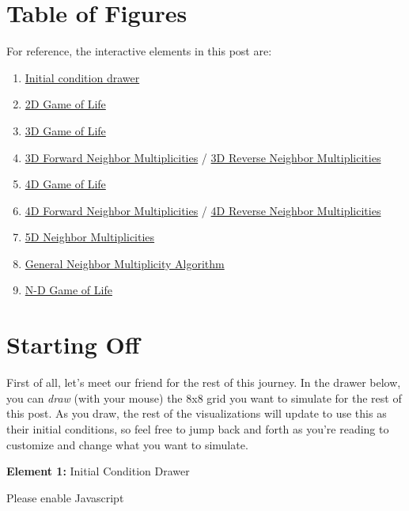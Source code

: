 \documentclass[]{article}
\begin{document}
\hypertarget{table-of-figures}{%
\section{Table of Figures}\label{table-of-figures}}

For reference, the interactive elements in this post are:

\begin{enumerate}
\def\labelenumi{\arabic{enumi}.}
\tightlist
\item
  \protect\hyperlink{golDrawer}{Initial condition drawer}
\item
  \protect\hyperlink{gol2D}{2D Game of Life}
\item
  \protect\hyperlink{gol3D}{3D Game of Life}
\item
  \protect\hyperlink{golSyms3DForward}{3D Forward Neighbor Multiplicities} /
  \protect\hyperlink{golSyms3DReverse}{3D Reverse Neighbor Multiplicities}
\item
  \protect\hyperlink{gol4D}{4D Game of Life}
\item
  \protect\hyperlink{golSyms4DForward}{4D Forward Neighbor Multiplicities} /
  \protect\hyperlink{golSyms4DReverse}{4D Reverse Neighbor Multiplicities}
\item
  \protect\hyperlink{golSyms5D}{5D Neighbor Multiplicities}
\item
  \protect\hyperlink{golTree}{General Neighbor Multiplicity Algorithm}
\item
  \protect\hyperlink{golFlat}{N-D Game of Life}
\end{enumerate}

\hypertarget{starting-off}{%
\section{Starting Off}\label{starting-off}}

First of all, let's meet our friend for the rest of this journey. In the drawer
below, you can \emph{draw} (with your mouse) the 8x8 grid you want to simulate
for the rest of this post. As you draw, the rest of the visualizations will
update to use this as their initial conditions, so feel free to jump back and
forth as you're reading to customize and change what you want to simulate.

\leavevmode\hypertarget{golDrawer}{}%
\textbf{Element 1:} Initial Condition Drawer

\leavevmode\hypertarget{golDrawerCont}{}%
Please enable Javascript
\end{document}

